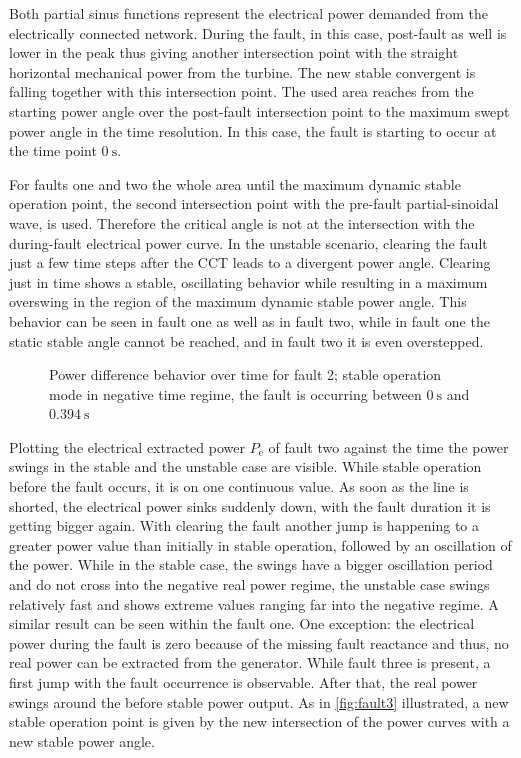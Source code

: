 Both partial sinus functions represent the electrical power demanded from the electrically connected network. During the fault, in this case, post-fault as well is lower in the peak thus giving another intersection point with the straight horizontal mechanical power from the turbine. The new stable convergent is falling together with this intersection point. The used area reaches from the starting power angle over the post-fault intersection point to the maximum swept power angle in the time resolution. In this case, the fault is starting to occur at the time point $0~\mathrm{s}$.

For faults one and two the whole area until the maximum dynamic stable operation point, the second intersection point with the pre-fault partial-sinoidal wave, is used. Therefore the critical angle is not at the intersection with the during-fault electrical power curve. In the unstable scenario, clearing the fault just a few time steps after the \acs{CCT} leads to a divergent power angle. Clearing just in time shows a stable, oscillating behavior while resulting in a maximum overswing in the region of the maximum dynamic stable power angle. This behavior can be seen in fault one as well as in fault two, while in fault one the static stable angle cannot be reached, and in fault two it is even overstepped.

\begin{figure}[H]
        \centering
        
        \caption[Power difference behavior over time for fault 2]{Power difference behavior over time for fault 2; stable operation mode in negative time regime, the fault is occurring between $0~\mathrm{s}$ and $0.394~\mathrm{s}$}
        \label{fig:pd-fault2}
\end{figure}

Plotting the electrical extracted power $P_\mathrm{e}$ of fault two against the time the power swings in the stable and the unstable case are visible. While stable operation before the fault occurs, it is on one continuous value. As soon as the line is shorted, the electrical power sinks suddenly down, with the fault duration it is getting bigger again. With clearing the fault another jump is happening to a greater power value than initially in stable operation, followed by an oscillation of the power. While in the stable case, the swings have a bigger oscillation period and do not cross into the negative real power regime, the unstable case swings relatively fast and shows extreme values ranging far into the negative regime. A similar result can be seen within the fault one. One exception: the electrical power during the fault is zero because of the missing fault reactance and thus, no real power can be extracted from the generator. While fault three is present, a first jump with the fault occurrence is observable. After that, the real power swings around the before stable power output. As in \autoref{fig:fault3} illustrated, a new stable operation point is given by the new intersection of the power curves with a new stable power angle.


